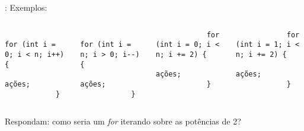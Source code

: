 \begin{frame}[fragile]{\insertsection: \insertsubsection}
	Exemplos:
	\begin{columns}
		\begin{verbatim}
			for (int i = 0; i < n; i++) {
				ações;
			}
		\end{verbatim}
		\begin{verbatim}
			for (int i = n; i > 0; i--) {
				ações;
			}
		\end{verbatim}

		\begin{verbatim}
			for (int i = 0; i < n; i += 2) {
				ações;
			}
		\end{verbatim}
		\begin{verbatim}
			for (int i = 1; i < n; i += 2) {
				ações;
			}
		\end{verbatim}
	\end{columns}

	Respondam: como seria um \textit{for} iterando sobre as potências de 2?
\end{frame}
